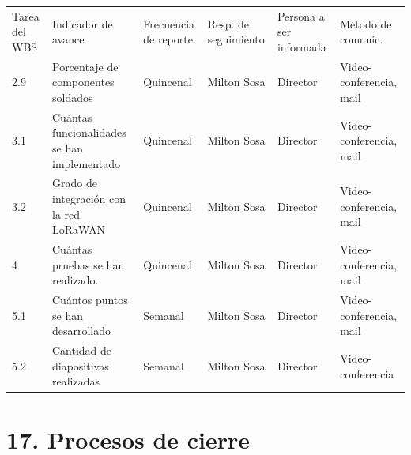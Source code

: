 \documentclass[11pt]{charter}
\begin{document}
\begin{table}[H]
	\centering
	\begin{tabularx}{\linewidth}{@{}|X|X|X|X|X|X|@{}}
		\hline
		\rowcolor[HTML]{C0C0C0} 
		\multicolumn{6}{|c|}{\cellcolor[HTML]{C0C0C0}SEGUIMIENTO DE AVANCE}                                                                       \\ \hline
		\rowcolor[HTML]{C0C0C0} 
		Tarea del WBS & Indicador de avance & Frecuencia de reporte & Resp. de seguimiento & Persona a ser informada & Método de comunic.\\ \hline
		2.9&Porcentaje de componentes soldados&Quincenal&Milton Sosa&Director&Video-conferencia, mail\\ \hline
		3.1&Cuántas funcionalidades se han implementado&Quincenal&Milton Sosa&Director&Video-conferencia, mail\\ \hline
		3.2&Grado de integración con la red LoRaWAN&Quincenal&Milton Sosa&Director&Video-conferencia, mail\\ \hline
		4&Cuántas pruebas se han realizado.&Quincenal&Milton Sosa&Director&Video-conferencia, mail\\ \hline
		5.1&Cuántos puntos se han desarrollado&Semanal&Milton Sosa&Director&Video-conferencia, mail\\ \hline
		5.2&Cantidad de diapositivas realizadas&Semanal&Milton Sosa&Director& Video-conferencia \\ \hline
	\end{tabularx}%
\end{table}

\section{17. Procesos de cierre}    
\label{sec:cierre}
\end{document}
